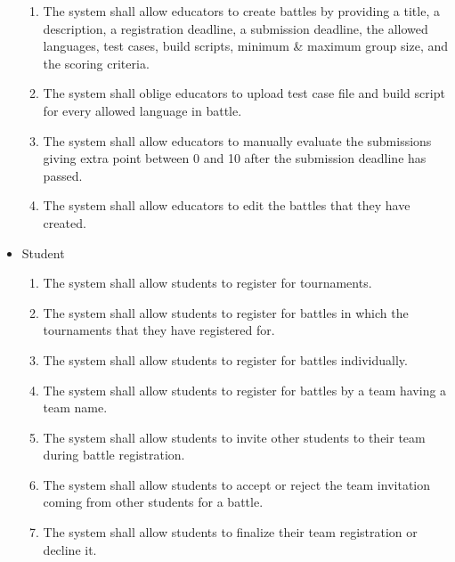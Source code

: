 \begin{itemize}
\begin{enumerate}[resume]
            \item The system shall allow educators to create battles by providing a title, a description, a registration deadline, a submission deadline, the allowed languages, test cases, build scripts, minimum \& maximum group size, and the scoring criteria.
            \item The system shall oblige educators to upload test case file and build script for every allowed language in battle.
		\item The system shall allow educators to manually evaluate the submissions giving extra point between 0 and 10 after the submission deadline has passed.
            \item The system shall allow educators to edit the battles that they have created.
	\end{enumerate}



	\item Student
        \begin{enumerate}[resume]
		\item The system shall allow students to register for tournaments.
		\item The system shall allow students to register for battles in which the tournaments that they have registered for.
  \item The system shall allow students to register for battles individually.
  \item The system shall allow students to register for battles by a team having a team name.
  \item The system shall allow students to invite other students to their team during battle registration.
  \item The system shall allow students to accept or reject the team invitation coming from other students for a battle.
  \item The system shall allow students to finalize their team registration or decline it.
  
	\end{enumerate}




\end{itemize}

